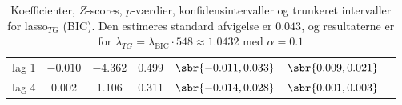 \begin{table}[h]
{\begin{tabular}{lcccccc}
\textcolor{blue3}{lag 1}   & $- 0.010$& $ -4.362$  &0.499  &  $\sbr{-0.011 , 0.033}$&  $\sbr{0.009           ,    0.021 }$\\
\textcolor{blue3}{lag 4}  &0.002 &   1.106  &0.311    & $\sbr{ -0.014,   0.028 }$  & $\sbr{0.001              , 0.003}$\\
\bottomrule
\end{tabular}  
}
\caption{
Koefficienter, \(Z\)-scores, \(p\)-værdier, konfidensintervaller og trunkeret intervaller for lasso\(_{TG}\) (BIC). Den estimeres standard afvigelse er \(0.043\), og resultaterne er for \(\lambda_{TG} = \lambda_\text{BIC} \cdot 548 \approx 1.0432\) med \(\alpha = 0.1\)} \label{tab:fixedLassoInf_bic}
\end{table} 
